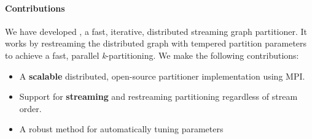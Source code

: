 \paragraph{Contributions}
We have developed \ourmethod, a fast, iterative, distributed streaming graph partitioner.
It works by restreaming the distributed graph with tempered partition parameters to achieve a fast, parallel \textit{k}-partitioning.
We make the following contributions:
\begin{itemize}
\item A \textbf{scalable} distributed, open-source partitioner implementation using MPI.
\item Support for \textbf{streaming} and restreaming partitioning regardless of stream order.
\item A robust method for automatically tuning \ourmethod parameters 
\end{itemize}



